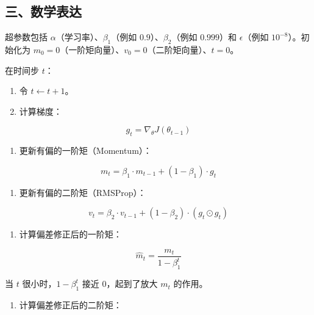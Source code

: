 \hypertarget{ux4e09ux6570ux5b66ux8868ux8fbe-2}{%
\subsection{三、数学表达}\label{ux4e09ux6570ux5b66ux8868ux8fbe-2}}

超参数包括 \(\alpha\)（学习率）、\(\beta_1\)（例如 \(0.9\)）、\(\beta_2\)（例如 \(0.999\)）和 \(\epsilon\)（例如 \(10^{-8}\)）。初始化为 \(m_0=0\)（一阶矩向量）、\(v_0=0\)（二阶矩向量）、\(t=0\)。

在时间步 \(t\)：

\begin{enumerate}
\def\labelenumi{\arabic{enumi}.}
\tightlist
\item
  令 \(t \leftarrow t+1\)。
\item
{}
  计算梯度：
\end{enumerate}

\[
g_t = \nabla_\theta J(\theta_{t-1})
\]

\begin{enumerate}
\def\labelenumi{\arabic{enumi}.}
\setcounter{enumi}{2}
\tightlist
\item
{}
  更新有偏的一阶矩（Momentum）：
\end{enumerate}

\[
m_t = \beta_1 \cdot m_{t-1} + (1-\beta_1)\cdot g_t
\]

\begin{enumerate}
\def\labelenumi{\arabic{enumi}.}
\setcounter{enumi}{3}
\tightlist
\item
{}
  更新有偏的二阶矩（RMSProp）：
\end{enumerate}

\[
v_t = \beta_2 \cdot v_{t-1} + (1-\beta_2)\cdot (g_t \odot g_t)
\]

\begin{enumerate}
\def\labelenumi{\arabic{enumi}.}
\setcounter{enumi}{4}
\tightlist
\item
{}
  计算偏差修正后的一阶矩：
\end{enumerate}

\[
\hat{m}_t = \frac{m_t}{1-\beta_1^t}
\]

当 \(t\) 很小时，\(1-\beta_1^t\) 接近 \(0\)，起到了放大 \(m_t\) 的作用。

\begin{enumerate}
\def\labelenumi{\arabic{enumi}.}
\setcounter{enumi}{5}
\tightlist
\item
{}
  计算偏差修正后的二阶矩：
\end{enumerate}


